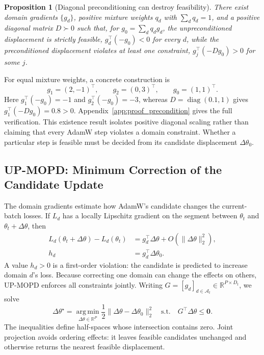 \documentclass{article}
\newtheorem{proposition}{Proposition}
\begin{document}
\begin{proposition}[Diagonal preconditioning can destroy feasibility]
\label{prop:precondition}
There exist domain gradients $\{g_d\}$, positive mixture weights $q_d$ with
$\sum_dq_d=1$, and a positive diagonal matrix $D\succ0$ such that, for
$g_0=\sum_dq_dg_d$, the unpreconditioned displacement is strictly feasible,
$g_d^\top(-g_0)<0$ for every $d$, while the preconditioned displacement
violates at least one constraint, $g_j^\top(-Dg_0)>0$ for some $j$.
\end{proposition}
For equal mixture weights, a concrete construction is
\begin{equation}
g_1=(2,-1)^\top,\qquad g_2=(0,3)^\top,\qquad g_0=(1,1)^\top.
\label{eq:precondition_example}
\end{equation}
Here $g_1^\top(-g_0)=-1$ and $g_2^\top(-g_0)=-3$, whereas
$D=\operatorname{diag}(0.1,1)$ gives $g_1^\top(-Dg_0)=0.8>0$.
Appendix~\ref{app:proof_precondition} gives the full verification. This
existence result isolates positive diagonal scaling rather than claiming that
every AdamW step violates a domain constraint. Whether a particular step is
feasible must be decided from its candidate displacement $\Delta\theta_0$.

\subsection{UP-MOPD: Minimum Correction of the Candidate Update}
\label{sec:up_mopd}

The domain gradients estimate how AdamW's candidate changes the current-batch
losses. If $L_d$ has a locally Lipschitz gradient on the segment between
$\theta_t$ and $\theta_t+\Delta\theta$, then
\begin{equation}
\begin{aligned}
L_d(\theta_t+\Delta\theta)-L_d(\theta_t)
&=g_d^\top\Delta\theta+O(\|\Delta\theta\|_2^2),\\
h_d&=g_d^\top\Delta\theta_0.
\end{aligned}
\label{eq:up_harm}
\end{equation}
A value $h_d>0$ is a first-order violation: the candidate is predicted to
increase domain $d$'s loss. Because correcting one domain can change the
effects on others, UP-MOPD enforces all constraints jointly. Writing
$G=[g_d]_{d\in\mathcal A_t}\in\mathbb R^{P\times D_t}$, we solve
\begin{equation}
\Delta\theta^\star
=\operatorname*{arg\,min}_{\Delta\theta\in\mathbb R^P}
\frac12\|\Delta\theta-\Delta\theta_0\|_2^2
\quad\text{s.t.}\quad
G^\top\Delta\theta\le\mathbf0.
\label{eq:up_projection}
\end{equation}
The inequalities define half-spaces whose intersection contains zero.
Joint projection avoids ordering effects: it leaves feasible candidates
unchanged and otherwise returns the nearest feasible displacement.
\end{document}
